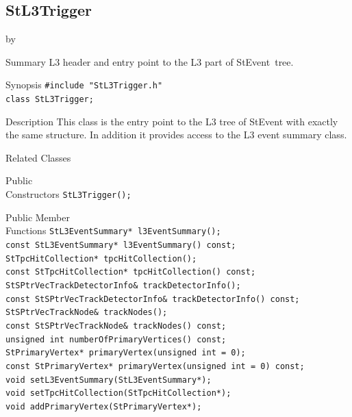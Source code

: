 \documentclass[twoside]{article}
\newcommand{\StEvent}{\textsf{StEvent}}
\newcommand{\entrylabel}[1]{\mbox{\textbf{{#1}}}\hfil}%
\newenvironment{entry}
{\begin{list}{}%
    {\renewcommand{\makelabel}{\entrylabel}%
     \setlength{\labelwidth}{90pt}%
     \setlength{\leftmargin}{\labelwidth}
     \advance\leftmargin by \labelsep%
      }%
    }%
  {\end{list}}
\newcommand{\Entrylabel}[1]%
{\raisebox{0pt}[1ex][0pt]{\makebox[\labelwidth][l]%
    {\parbox[t]{\labelwidth}{\hspace{0pt}\textbf{{#1}}}}}}
\newenvironment{Entry}%
{\renewcommand{\entrylabel}{\Entrylabel}\begin{entry}}%
  {\end{entry}}
\begin{document}
\subsection{StL3Trigger}
\label{sec:StL3Trigger}
\begin{Entry}
\item[Summary] L3 header and entry point to the L3 part of \StEvent\ tree.
\item[Synopsis]
    \verb+#include "StL3Trigger.h"+\\
    \verb+class StL3Trigger;+\\
\item[Description] This class is the entry point to the L3 tree of \StEvent\/
        with exactly the same structure. In addition it provides access to the L3
        event summary class.
\item[Related Classes]
\item[Public\\ Constructors]
    \verb+StL3Trigger();+\\
\item[Public Member\\ Functions]
    \verb+StL3EventSummary* l3EventSummary();+\\
    \verb+const StL3EventSummary* l3EventSummary() const;+\\

    \verb+StTpcHitCollection* tpcHitCollection();+\\
    \verb+const StTpcHitCollection* tpcHitCollection() const;+\\

    \verb+StSPtrVecTrackDetectorInfo& trackDetectorInfo();+\\
    \verb+const StSPtrVecTrackDetectorInfo& trackDetectorInfo() const;+\\

    \verb+StSPtrVecTrackNode& trackNodes();+\\
    \verb+const StSPtrVecTrackNode& trackNodes() const;+\\

    \verb+unsigned int numberOfPrimaryVertices() const;+\\
    \verb+StPrimaryVertex* primaryVertex(unsigned int = 0);+\\
    \verb+const StPrimaryVertex* primaryVertex(unsigned int = 0) const;+\\

    \verb+void setL3EventSummary(StL3EventSummary*);+\\
    \verb+void setTpcHitCollection(StTpcHitCollection*);+\\
    \verb+void addPrimaryVertex(StPrimaryVertex*);+\\
\end{Entry}
\clearpage
\end{document}

